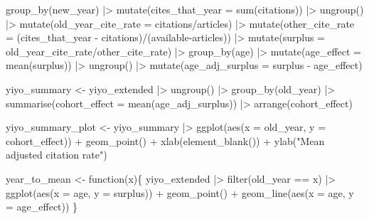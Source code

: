 \documentclass[
  10pt,
  letterpaper,
  DIV=11,
  numbers=noendperiod,
  twoside]{scrartcl}
\newenvironment{Shaded}{\begin{snugshade}}{\end{snugshade}}
\newcommand{\AttributeTok}[1]{\textcolor[rgb]{0.40,0.45,0.13}{#1}}
\newcommand{\ControlFlowTok}[1]{\textcolor[rgb]{0.00,0.23,0.31}{#1}}
\newcommand{\FunctionTok}[1]{\textcolor[rgb]{0.28,0.35,0.67}{#1}}
\newcommand{\NormalTok}[1]{\textcolor[rgb]{0.00,0.23,0.31}{#1}}
\newcommand{\OtherTok}[1]{\textcolor[rgb]{0.00,0.23,0.31}{#1}}
\newcommand{\SpecialCharTok}[1]{\textcolor[rgb]{0.37,0.37,0.37}{#1}}
\newcommand{\StringTok}[1]{\textcolor[rgb]{0.13,0.47,0.30}{#1}}
\begin{document}
\begin{Shaded}
\begin{Highlighting}[]
  \FunctionTok{group\_by}\NormalTok{(new\_year) }\SpecialCharTok{|\textgreater{}}
  \FunctionTok{mutate}\NormalTok{(}\AttributeTok{cites\_that\_year =} \FunctionTok{sum}\NormalTok{(citations)) }\SpecialCharTok{|\textgreater{}}
  \FunctionTok{ungroup}\NormalTok{() }\SpecialCharTok{|\textgreater{}}
  \FunctionTok{mutate}\NormalTok{(}\AttributeTok{old\_year\_cite\_rate =}\NormalTok{ citations}\SpecialCharTok{/}\NormalTok{articles) }\SpecialCharTok{|\textgreater{}}
  \FunctionTok{mutate}\NormalTok{(}\AttributeTok{other\_cite\_rate =}\NormalTok{ (cites\_that\_year }\SpecialCharTok{{-}}\NormalTok{ citations)}\SpecialCharTok{/}\NormalTok{(available}\SpecialCharTok{{-}}\NormalTok{articles)) }\SpecialCharTok{|\textgreater{}}
  \FunctionTok{mutate}\NormalTok{(}\AttributeTok{surplus =}\NormalTok{ old\_year\_cite\_rate}\SpecialCharTok{/}\NormalTok{other\_cite\_rate) }\SpecialCharTok{|\textgreater{}}
  \FunctionTok{group\_by}\NormalTok{(age) }\SpecialCharTok{|\textgreater{}}
  \FunctionTok{mutate}\NormalTok{(}\AttributeTok{age\_effect =} \FunctionTok{mean}\NormalTok{(surplus)) }\SpecialCharTok{|\textgreater{}}
  \FunctionTok{ungroup}\NormalTok{() }\SpecialCharTok{|\textgreater{}}
  \FunctionTok{mutate}\NormalTok{(}\AttributeTok{age\_adj\_surplus =}\NormalTok{ surplus }\SpecialCharTok{{-}}\NormalTok{ age\_effect)}
  
\NormalTok{yiyo\_summary }\OtherTok{\textless{}{-}}\NormalTok{ yiyo\_extended }\SpecialCharTok{|\textgreater{}}
  \FunctionTok{ungroup}\NormalTok{() }\SpecialCharTok{|\textgreater{}}
  \FunctionTok{group\_by}\NormalTok{(old\_year) }\SpecialCharTok{|\textgreater{}}
  \FunctionTok{summarise}\NormalTok{(}\AttributeTok{cohort\_effect =} \FunctionTok{mean}\NormalTok{(age\_adj\_surplus)) }\SpecialCharTok{|\textgreater{}}
  \FunctionTok{arrange}\NormalTok{(cohort\_effect)}

\NormalTok{yiyo\_summary\_plot }\OtherTok{\textless{}{-}}\NormalTok{ yiyo\_summary }\SpecialCharTok{|\textgreater{}} 
    \FunctionTok{ggplot}\NormalTok{(}\FunctionTok{aes}\NormalTok{(}\AttributeTok{x =}\NormalTok{ old\_year, }\AttributeTok{y =}\NormalTok{ cohort\_effect)) }\SpecialCharTok{+} 
    \FunctionTok{geom\_point}\NormalTok{() }\SpecialCharTok{+}
    \FunctionTok{xlab}\NormalTok{(}\FunctionTok{element\_blank}\NormalTok{()) }\SpecialCharTok{+}
    \FunctionTok{ylab}\NormalTok{(}\StringTok{"Mean adjusted citation rate"}\NormalTok{)}

\NormalTok{year\_to\_mean }\OtherTok{\textless{}{-}} \ControlFlowTok{function}\NormalTok{(x)\{}
\NormalTok{  yiyo\_extended }\SpecialCharTok{|\textgreater{}}
    \FunctionTok{filter}\NormalTok{(old\_year }\SpecialCharTok{==}\NormalTok{ x) }\SpecialCharTok{|\textgreater{}}
    \FunctionTok{ggplot}\NormalTok{(}\FunctionTok{aes}\NormalTok{(}\AttributeTok{x =}\NormalTok{ age, }\AttributeTok{y =}\NormalTok{ surplus)) }\SpecialCharTok{+} 
    \FunctionTok{geom\_point}\NormalTok{() }\SpecialCharTok{+}
    \FunctionTok{geom\_line}\NormalTok{(}\FunctionTok{aes}\NormalTok{(}\AttributeTok{x =}\NormalTok{ age, }\AttributeTok{y =}\NormalTok{ age\_effect))}
\NormalTok{\}}
\end{Highlighting}
\end{Shaded}
\end{document}
